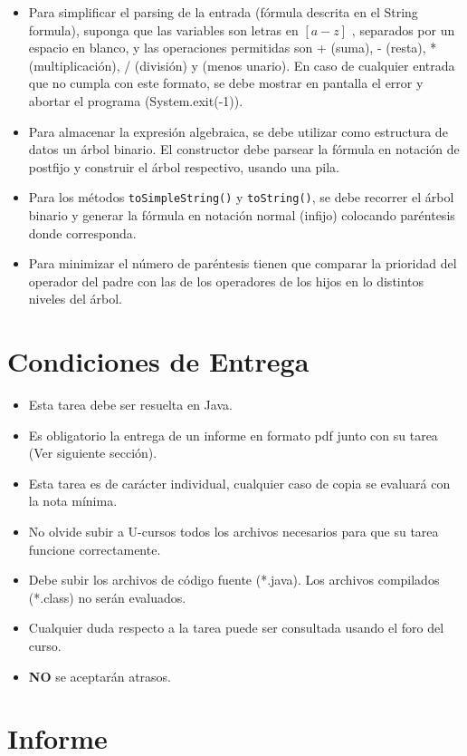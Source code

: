 \documentclass[dcc]{fcfmcourse}
\begin{document}
\begin{itemize}
\item Para simplificar el parsing de la entrada (fórmula descrita en el String formula), suponga que las variables son letras en $\left[a-z\right]$ , separados por un espacio en blanco, y las operaciones permitidas son + (suma), - (resta), * (multiplicación), / (división) y (menos unario). En caso de cualquier entrada que no cumpla con este formato, se debe mostrar en pantalla el error y abortar el programa (System.exit(-1)).
\item Para almacenar la expresión algebraica, se debe utilizar como estructura de datos un árbol binario. El constructor debe parsear la fórmula en notación de postfijo y construir el  árbol respectivo, usando una pila.
\item Para los métodos \texttt{toSimpleString()} y \texttt{toString()}, se debe recorrer el  árbol binario y generar la fórmula en notación normal (infijo) colocando paréntesis donde corresponda.
\item Para minimizar el número de paréntesis tienen que comparar la prioridad del operador del padre
con las de los operadores de los hijos en lo distintos niveles del árbol.
\end{itemize}
\newpage
\section{Condiciones de Entrega}

\begin{itemize}
    \item Esta tarea debe ser resuelta en Java.
    \item Es obligatorio la entrega de un informe en formato pdf junto con su tarea (Ver siguiente sección).
    \item Esta tarea es de carácter individual, cualquier caso de copia se evaluará con la nota mínima.
    \item No olvide subir a U-cursos todos los archivos necesarios para que su tarea funcione correctamente.
    \item Debe subir los archivos de código fuente (*.java). Los archivos compilados (*.class) no serán evaluados.
    \item Cualquier duda respecto a la tarea puede ser consultada usando el foro del curso.
    \item \textbf{NO} se aceptarán atrasos.
\end{itemize}

\section{Informe}
\end{document}
